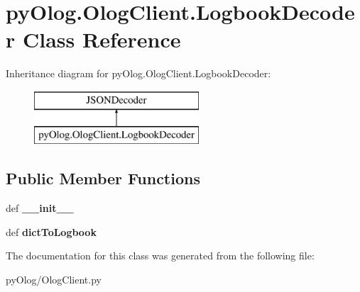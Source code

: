 \hypertarget{classpyOlog_1_1OlogClient_1_1LogbookDecoder}{\section{py\-Olog.\-Olog\-Client.\-Logbook\-Decoder Class Reference}
\label{classpyOlog_1_1OlogClient_1_1LogbookDecoder}
}
Inheritance diagram for py\-Olog.\-Olog\-Client.\-Logbook\-Decoder\-:\begin{figure}[H]
\begin{center}
\leavevmode
\includegraphics[height=2.000000cm]{classpyOlog_1_1OlogClient_1_1LogbookDecoder}
\end{center}
\end{figure}
\subsection*{Public Member Functions}
\begin{DoxyCompactItemize}
\item 
\hypertarget{classpyOlog_1_1OlogClient_1_1LogbookDecoder_ae58c55891533f4eaa7cab68f454c71ee}{def {\bfseries \-\_\-\-\_\-init\-\_\-\-\_\-}}\label{classpyOlog_1_1OlogClient_1_1LogbookDecoder_ae58c55891533f4eaa7cab68f454c71ee}

\item 
\hypertarget{classpyOlog_1_1OlogClient_1_1LogbookDecoder_ad56ae6f4fd18c4d21a311c37b0e817ef}{def {\bfseries dict\-To\-Logbook}}\label{classpyOlog_1_1OlogClient_1_1LogbookDecoder_ad56ae6f4fd18c4d21a311c37b0e817ef}

\end{DoxyCompactItemize}


The documentation for this class was generated from the following file\-:\begin{DoxyCompactItemize}
\item 
py\-Olog/Olog\-Client.\-py\end{DoxyCompactItemize}
